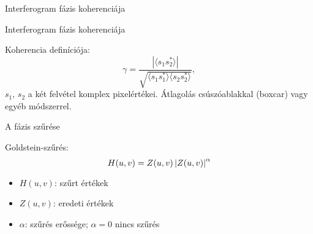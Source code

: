 \def\ft{Interferogram fázis koherenciája}


\begin{frame}{\ft}
    \begin{minic}{0.75}
    \end{minic}
\end{frame}


\begin{frame}{\ft}
    \begin{minipage}[c]{0.5\textwidth}
    \end{minipage}
    \hspace{10pt}
    \begin{minipage}[c]{0.4\textwidth}
    Koherencia definíciója:
    $$ \gamma = \frac{|\langle s_1 s_2^* \rangle|}{\sqrt{\langle s_1 s_1^*
        \rangle \langle s_2 s_2^* \rangle}}, $$
    $s_1$, $s_2$ a két felvétel komplex pixelértékei. Átlagolás csúszóablakkal (boxcar) vagy egyéb módszerrel.
    \end{minipage}
\end{frame}


\def\ft{A fázis szűrése}

\begin{frame}{\ft}
    \begin{minipage}[c]{0.5\textwidth}
    \end{minipage}
    \hspace{10pt}
    \begin{minipage}[c]{0.4\textwidth}
    Goldstein-szűrés:
    \[
        H(u,v) = Z(u,v) \left|Z(u,v)\right|^{\alpha}
    \]
    \begin{itemize}
        \item $H(u,v)$: szűrt értékek
        \item $Z(u,v)$: eredeti értékek
        \item $\alpha$: szűrés erőssége; $\alpha = 0$ nincs szűrés
    \end{itemize}
    \end{minipage}
\end{frame}
